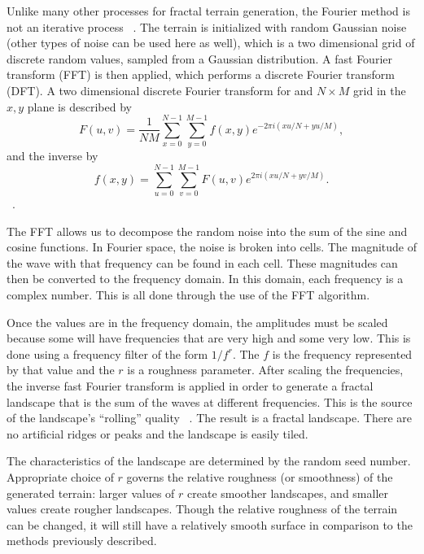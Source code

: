 \documentclass[11pt,twocolumn]{article}
\begin{document}
	Unlike many other processes for fractal terrain generation, the Fourier method is not an iterative process ~\cite{Kareem}.
	The terrain is initialized with random Gaussian noise (other types of noise can be used here as well), which is a two dimensional
	grid of discrete random values, sampled from a Gaussian distribution. A fast Fourier transform (FFT) is then applied, which performs a discrete
	Fourier transform (DFT). A two dimensional discrete Fourier transform for and $N \times M$ grid in the $x, y$ plane is described by
	\begin{equation}
	F(u,v)=\frac{1}{NM}\displaystyle\sum\limits_{x=0}^{N-1} \displaystyle\sum\limits_{y=0}^{M-1} f(x,y)e^{-2\pi i(xu/N+yu/M)},
	\end{equation}
	and the inverse by
	\begin{equation}
	f(x,y)=\displaystyle\sum\limits_{u=0}^{N-1} \displaystyle\sum\limits_{v=0}^{M-1} F(u,v)e^{2\pi i(xu/N+yv/M)}.
	\end{equation} ~\cite{CooleyTukey}.

	The FFT allows us to decompose the random noise into the sum of the sine and cosine functions. In Fourier space, the noise is broken
	into cells. The magnitude of the wave with that frequency can be found in each cell. These magnitudes can then be converted to
	the frequency domain. In this domain, each frequency is a complex number. This is all done through the use of the FFT algorithm.
	
	Once the values are in the frequency domain, the amplitudes must be scaled because some will have frequencies that are very high and
	some very low. This is done using a frequency filter of the form $1/f^{r}$. The $f$ is the frequency represented by that
	value and the $r$ is a roughness parameter. After scaling the frequencies, the inverse fast Fourier transform is applied
	in order to generate a fractal landscape that is the sum of the waves at different frequencies. This is the source of the landscape's
	``rolling'' quality ~\cite{Kareem}. The result is a fractal landscape. There are no artificial ridges or peaks and the landscape is easily tiled.
	
	The characteristics of the landscape are determined by the random seed number. Appropriate choice of $r$ governs the relative
	roughness (or smoothness) of the generated terrain: larger values of $r$ create smoother landscapes, and smaller
	values create rougher landscapes. Though the relative roughness of the terrain can be changed, it will still have
	a relatively smooth surface in comparison to the methods previously described.  
\end{document}
